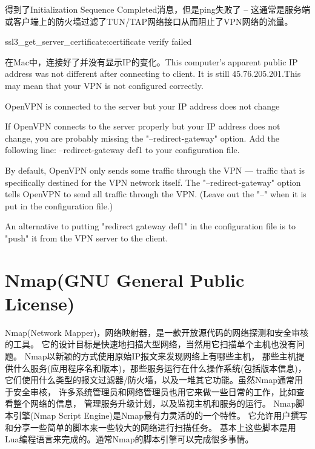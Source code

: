 \documentclass[11pt,fleqn]{book}
\makeatletter
\numberwithin{dummy}{section}
\theoremstyle{ocrenumbox}
\theoremstyle{blacknumex}
\theoremstyle{blacknumbox}
\theoremstyle{ocrenum}
\renewcommand{\subsubsection}{\@startsection {subsubsection}{3}{\z@}
	{-2ex \@plus -0.1ex \@minus -.2ex}
	{.2ex \@plus.2ex }
	{\normalfont\small\sffamily\bfseries}}
\renewcommand\paragraph{\@startsection{paragraph}{4}{\z@}
	{-2ex \@plus-.2ex \@minus .2ex}
	{.1ex}
	{\normalfont\small\sffamily\bfseries}}
\makeatother
\begin{document}
得到了Initialization Sequence Completed消息，但是ping失败了 -- 这通常是服务端或客户端上的防火墙过滤了TUN/TAP网络接口从而阻止了VPN网络的流量。  

\subsubsection{ssl3\_get\_server\_certificate:certificate verify failed}

在Mac中，连接好了并没有显示IP的变化。This computer's apparent public IP address was not different after connecting to client. It is still 45.76.205.201.This may mean that your VPN is not configured correctly.


\paragraph{OpenVPN is connected to the server but your IP address does not change}

If OpenVPN connects to the server properly but your IP address does not change, you are probably missing the "--redirect-gateway" option. Add the following line:
--redirect-gateway def1 to your configuration file.

By default, OpenVPN only sends some traffic through the VPN — traffic that is specifically destined for the VPN network itself. The "--redirect-gateway" option tells OpenVPN to send all traffic through the VPN. (Leave out the "--" when it is put in the configuration file.)

An alternative to putting "redirect gateway def1" in the configuration file is to "push" it from the VPN server to the client.

\chapter{Nmap(GNU General Public License)}

Nmap(Network Mapper)，网络映射器，是一款开放源代码的网络探测和安全审核的工具。
它的设计目标是快速地扫描大型网络，当然用它扫描单个主机也没有问题。
Nmap以新颖的方式使用原始IP报文来发现网络上有哪些主机，
那些主机提供什么服务(应用程序名和版本)，那些服务运行在什么操作系统(包括版本信息)，
它们使用什么类型的报文过滤器/防火墙，以及一堆其它功能。虽然Nmap通常用于安全审核，
许多系统管理员和网络管理员也用它来做一些日常的工作，比如查看整个网络的信息，
管理服务升级计划，以及监视主机和服务的运行。
Nmap脚本引擎(Nmap Script Engine)是Nmap最有力灵活的的一个特性。
它允许用户撰写和分享一些简单的脚本来一些较大的网络进行扫描任务。
基本上这些脚本是用Lua编程语言来完成的。通常Nmap的脚本引擎可以完成很多事情。
\end{document}
